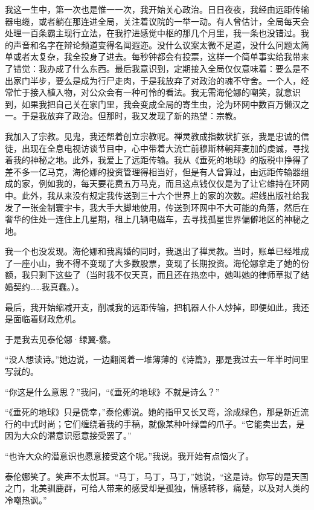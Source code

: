 \documentclass[AutoFakeBold=true]{book}
\begin{document}
我这一生中，第一次也是惟一一次，我开始关心政治。日日夜夜，我经由远距传输器电缆，或者躺在那连进全局，关注着议院的一举一动。有人曾估计，全局每天会处理一百条霸主现行立法，在我拧进感觉中枢的那几个月里，我一条也没错过。我的声音和名字在辩论频道变得名闻遐迩。没什么议案太微不足道，没什么问题太简单或者太复杂，我全投身了进去。每秒钟都会有投票，这样一个简单事实给我带来了错觉：我办成了什么东西。最后我意识到，定期接入全局仅仅意味着：要么是不出家门半步，要么是成为行尸走肉，于是我放弃了对政治的魂不守舍。一个人，经常忙于接入植入物，对公众会有一种可怜的看法。我无需海伦娜的嘲笑，就意识到，如果我把自己关在家门里，我会变成全局的寄生虫，沦为环网中数百万懒汉之一。于是我放弃了政治。但那时，我又发现了新的热望：宗教。

我加入了宗教。见鬼，我还帮着创立宗教呢。禅灵教成指数状扩张，我是忠诚的信徒，出现在全息电视访谈节目中，心中带着大流亡前穆斯林朝拜麦加的虔诚，寻找着我的神秘之地。此外，我爱上了远距传输。我从《垂死的地球》的版税中挣得了差不多一亿马克，海伦娜的投资管理得相当好，但是有人曾算过，由远距传输器组成的家，例如我的，每天要花费五万马克，而且这点钱仅仅是为了让它维持在环网中。此外，我从来没有规定我传送到三十六个世界上的家的次数。超线出版社给我发了一张金制寰宇卡，我大手大脚地使用，传送到环网中不大可能的角落，然后在奢华的住处一连住上几星期，租上几辆电磁车，去寻找孤星世界偏僻地区的神秘之地。

我一个也没发现。海伦娜和我离婚的同时，我退出了禅灵教。当时，账单已经堆成了一座小山，我不得不变现了大多数股票，变现了长期投资。海伦娜拿走了她的份额，我只剩下这些了（当时我不仅天真，而且还在热恋中，她叫她的律师草拟了结婚契约……我真蠢。）。

最后，我开始缩减开支，削减我的远距传输，把机器人仆人炒掉，即便如此，我还是面临着财政危机。

于是我去见泰伦娜·绿翼-翡。

\vspace*{1em}

``没人想读诗。''她边说，一边翻阅着一堆薄薄的《诗篇》，那是我过去一年半时间里写就的。

``你这是什么意思？''我问，``《垂死的地球》不就是诗么？''

``《垂死的地球》只是侥幸，''泰伦娜说。她的指甲又长又弯，涂成绿色，那是新近流行的中式时尚；它们缠绕着我的手稿，就像某种叶绿兽的爪子。``它能卖出去，是因为大众的潜意识愿意接受罢了。''

``也许大众的潜意识也愿意接受这个呢。''我说。我开始有点恼火了。

泰伦娜笑了。笑声不太悦耳。``马丁，马丁，马丁，''她说，``这是诗。你写的是天国之门，北美驯鹿群，可给人带来的感受却是孤独，情感转移，痛楚，以及对人类的冷嘲热讽。''
\end{document}
